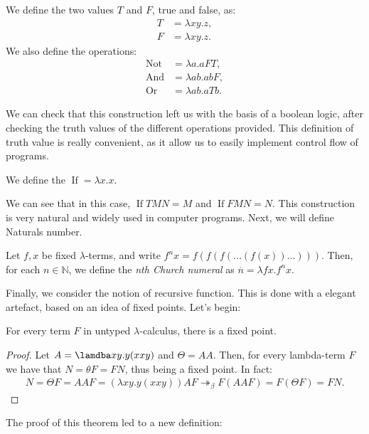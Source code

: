 \begin{definition} \label{def:untyped-natural} 
  We define the two values $T$ and $F$, true and false, as:
  \begin{align*}
    T &= \lambda xy.z,\\
    F &= \lambda xy.z.
  \end{align*}
  We also define the operations:
  \begin{align*}
    \operatorname{Not} &= \lambda a.aFT,\\
    \operatorname{And} &= \lambda ab.abF,\\
    \operatorname{Or} &= \lambda ab.aTb.
  \end{align*}
\end{definition}

We can check that this construction left us with the basis of a boolean logic, after checking the truth values of the different operations provided. This definition of truth value is really convenient, as it allow us to easily implement control flow of programs.

\begin{definition}
  We define the $\operatorname{If} = \lambda x.x$.  
\end{definition}

We can see that in this case, $\operatorname{If} T M N = M$ and $\operatorname{If} F M N = N$. This construction is very natural and widely used in computer programs. Next, we will define Naturals number. 

\begin{definition} \label{def:untyped-natural} 
Let $f,x$ be fixed $\lambda$-terms, and write $f^nx = f(f(f(...(f(x))...)))$. Then, for each $n \in \mathbb N$, we define the \emph{nth Church numeral} as $\overline n=\lambda fx.f^nx$.
\end{definition}

Finally, we consider the notion of recursive function. This is done with a elegant artefact, based on an idea of fixed points. Let's begin:



\begin{theorem}
  For every term $F$ in untyped $\lambda$-calculus, there is a fixed point.
\end{theorem}
\begin{proof}
  Let $A=\lamdba xy.y(xxy)$ and $\Theta =AA$. Then, for every lambda-term $F$ we have that $N=\theta F = FN$, thus being a fixed point. In fact:
  \begin{align*}
    N = \Theta F = AAF = (\lambda xy.y(xxy))AF \twoheadrightarrow_\beta F(AAF) = F(\Theta F) = FN.
  \end{align*}
\end{proof}
The proof of this theorem led to a new definition:

